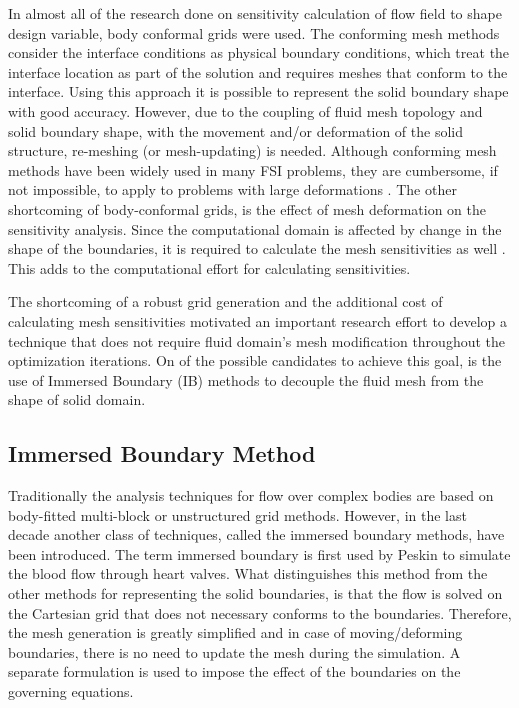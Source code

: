In almost all of the research done on sensitivity calculation of flow field to shape design variable, body conformal grids were used. The conforming mesh methods consider the interface conditions as physical boundary conditions, which treat the interface location as part of the solution and requires meshes that conform to the interface. Using this approach it is possible to represent the solid boundary shape with good accuracy. However, due to the coupling of fluid mesh topology and solid boundary shape, with the movement and/or deformation of the solid structure, re-meshing (or mesh-updating) is needed. Although conforming mesh methods have been widely used in many FSI problems, they are cumbersome, if not impossible, to apply to problems with large deformations \cite{sahin2009arbitrary}. The other shortcoming of body-conformal grids, is the effect of mesh deformation on the sensitivity analysis. Since the computational domain is affected by change in the shape of the boundaries, it is required to calculate the mesh sensitivities as well \cite{liu2013boundary}. This adds to the computational effort for calculating  sensitivities.

The shortcoming of a robust grid generation and the additional cost of calculating mesh sensitivities motivated an important research effort to develop a technique that does not require fluid domain's mesh modification throughout the optimization iterations. On of the possible candidates to achieve this goal, is the use of Immersed Boundary (IB) methods to decouple the fluid mesh from the shape of solid domain.
\subsection{Immersed Boundary Method}
Traditionally the analysis techniques for flow over complex bodies are based on body-fitted multi-block or unstructured grid methods. However, in the last decade another class of techniques, called the immersed boundary methods, have been introduced. The term immersed boundary is first used by Peskin \cite{peskin1977numerical} to simulate the blood flow through heart valves. What distinguishes this method from the other methods for representing the solid boundaries, is that the flow is solved on the Cartesian grid that does not necessary conforms to the boundaries. Therefore, the mesh generation is greatly simplified and in case of moving/deforming boundaries, there is no need to update the mesh during the simulation. A separate formulation is used to impose the effect of the boundaries on the governing equations.

